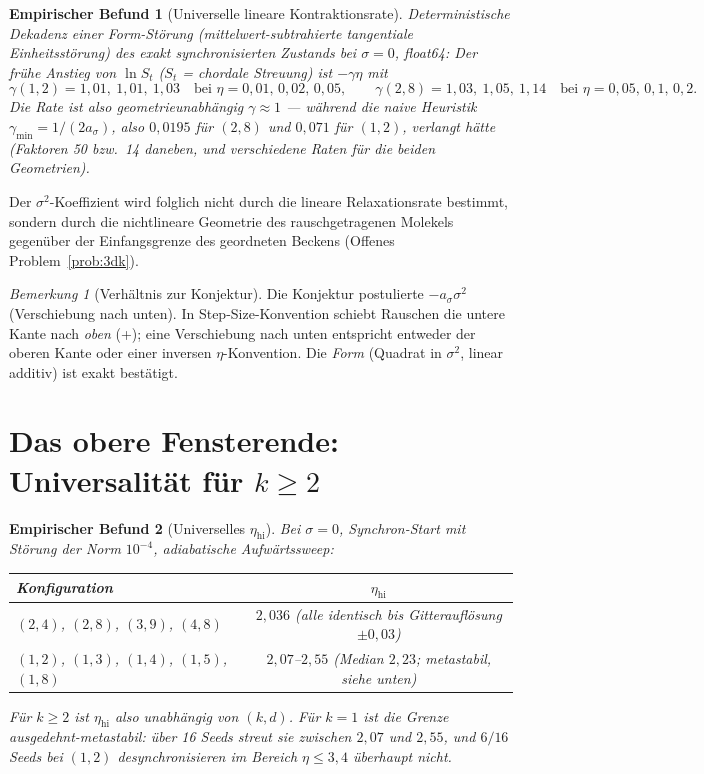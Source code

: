 \documentclass[11pt,a4paper]{article}
\newtheorem{befund}{Empirischer Befund}
\theoremstyle{remark}
\newtheorem{bemerkung}{Bemerkung}
\begin{document}
\begin{befund}[Universelle lineare Kontraktionsrate]\label{bef:gamma}
Deterministische Dekadenz einer Form-Störung (mittelwert-subtrahierte
tangentiale Einheitsstörung) des exakt synchronisierten Zustands bei
$\sigma=0$, float64: Der frühe Anstieg von $\ln S_t$ ($S_t$ = chordale
Streuung) ist $-\gamma\eta$ mit
\[
\gamma(1,2) = 1{,}01,\ 1{,}01,\ 1{,}03
\quad\text{bei }\eta=0{,}01,\,0{,}02,\,0{,}05,
\qquad
\gamma(2,8) = 1{,}03,\ 1{,}05,\ 1{,}14
\quad\text{bei }\eta=0{,}05,\,0{,}1,\,0{,}2 .
\]
Die Rate ist also \emph{geometrieunabhängig} $\gamma\approx1$ ---
während die naive Heuristik
$\gamma_{\min}=1/(2a_\sigma)$, also $0{,}0195$ für $(2,8)$ und $0{,}071$
für $(1,2)$, verlangt hätte (Faktoren 50 bzw.\ 14 daneben, und
\emph{verschiedene} Raten für die beiden Geometrien).
\end{befund}

Der $\sigma^2$-Koeffizient wird folglich nicht durch die lineare
Relaxationsrate bestimmt, sondern durch die nichtlineare Geometrie des
rauschgetragenen Molekels gegenüber der Einfangsgrenze des geordneten
Beckens (Offenes Problem~\ref{prob:3dk}).

\begin{bemerkung}[Verhältnis zur Konjektur]
Die Konjektur postulierte $-a_\sigma\sigma^2$ (Verschiebung nach unten).
In Step-Size-Konvention schiebt Rauschen die untere Kante nach \emph{oben}
(+); eine Verschiebung nach unten entspricht entweder der oberen Kante
oder einer inversen $\eta$-Konvention. Die \emph{Form} (Quadrat in
$\sigma^2$, linear additiv) ist exakt bestätigt.
\end{bemerkung}

\section{Das obere Fensterende: Universalität für $k\ge2$}

\begin{befund}[Universelles $\eta_{\mathrm{hi}}$]\label{bef:hi}
Bei $\sigma=0$, Synchron-Start mit Störung der Norm $10^{-4}$, adiabatische
Aufwärtssweep:
\begin{center}
\begin{tabular}{lc}
\toprule
Konfiguration & $\eta_{\mathrm{hi}}$\\
\midrule
$(2,4)$, $(2,8)$, $(3,9)$, $(4,8)$ & $2{,}036$ (alle identisch bis Gitterauflösung $\pm0{,}03$)\\
\midrule
$(1,2)$, $(1,3)$, $(1,4)$, $(1,5)$, $(1,8)$ & $2{,}07$--$2{,}55$ (Median $2{,}23$; metastabil, siehe unten)\\
\bottomrule
\end{tabular}
\end{center}
Für $k\ge2$ ist $\eta_{\mathrm{hi}}$ also \emph{unabhängig von $(k,d)$}.
Für $k=1$ ist die Grenze ausgedehnt-metastabil: über 16 Seeds streut sie
zwischen $2{,}07$ und $2{,}55$, und $6/16$ Seeds bei $(1,2)$ desynchronisieren
im Bereich $\eta\le3{,}4$ überhaupt nicht.
\end{befund}
\end{document}
